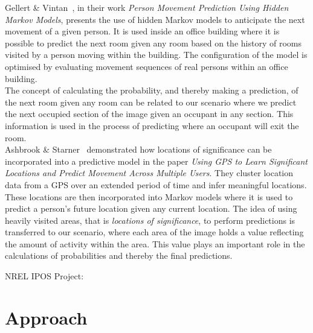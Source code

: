 Gellert \& Vintan~\cite{gellert}, in their work \emph{Person Movement Prediction Using Hidden Markov Models}, presents the use of hidden Markov models to anticipate the next movement of a given person. It is used inside an office building where it is possible to predict the next room given any room based on the history of rooms visited by a person moving within the building. The configuration of the model is optimised by evaluating movement sequences of real persons within an office building. \\
The concept of calculating the probability, and thereby making a prediction, of the next room given any room can be related to our scenario where we predict the next occupied section of the image given an occupant in any section. This information is used in the process of predicting where an occupant will exit the room. \\
Ashbrook \& Starner~\cite{ashbrook} demonstrated how locations of significance can be incorporated into a predictive model in the paper \emph{Using GPS to Learn Significant Locations and Predict Movement Across Multiple Users}. They cluster location data from a GPS over an extended period of time and infer meaningful locations. These locations are then incorporated into Markov models where it is used to predict a person's future location given any current location. The idea of using heavily visited areas, that is \emph{locations of significance}, to perform predictions is transferred to our scenario, where each area of the image holds a value reflecting the amount of activity within the area. This value plays an important role in the calculations of probabilities and thereby the final predictions.

NREL IPOS Project:



\section{Approach}

